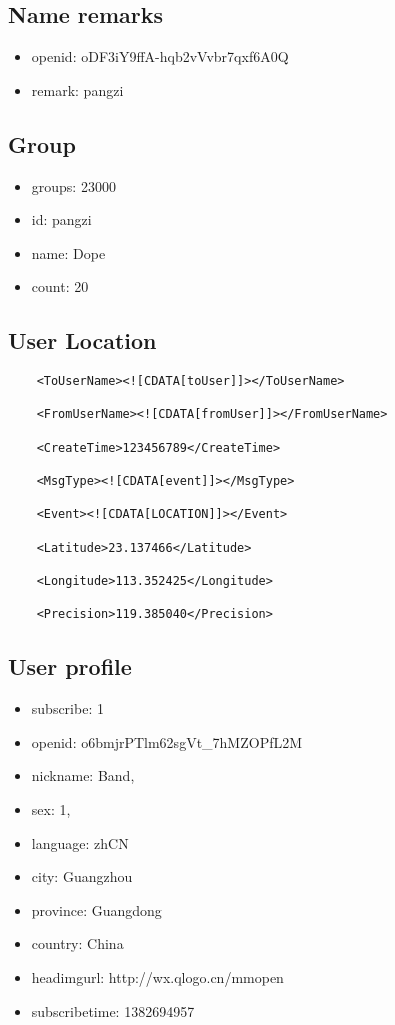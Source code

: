 \documentclass{article}
\begin{document}
\subsection{Name remarks}
\begin{itemize}
	\item openid: oDF3iY9ffA-hqb2vVvbr7qxf6A0Q
	\item remark: pangzi
\end{itemize}

\subsection{Group}
\begin{itemize}
	\item groups: 23000
	\item id: pangzi
	\item name: Dope
	\item count: 20
\end{itemize}

\subsection{User Location}
	\begin{verbatim}
	<ToUserName><![CDATA[toUser]]></ToUserName>

	<FromUserName><![CDATA[fromUser]]></FromUserName>

	<CreateTime>123456789</CreateTime>

	<MsgType><![CDATA[event]]></MsgType>

	<Event><![CDATA[LOCATION]]></Event>

	<Latitude>23.137466</Latitude>

	<Longitude>113.352425</Longitude>

	<Precision>119.385040</Precision>
	\end{verbatim}
\subsection{User profile}
\begin{itemize}
	\item subscribe: 1 
	\item openid: o6bmjrPTlm62sgVt\_7hMZOPfL2M
	\item nickname: Band,
	\item sex: 1,
	\item language: zhCN
	\item city: Guangzhou
	\item province: Guangdong
	\item country: China 
	\item headimgurl:    http://wx.qlogo.cn/mmopen
	\item subscribetime: 1382694957
\end{itemize}
\end{document}
